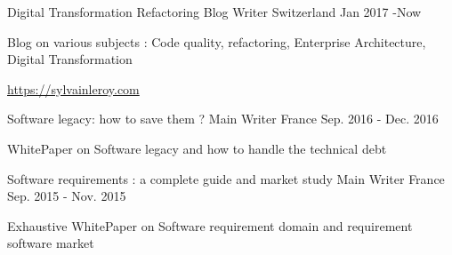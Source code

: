 

\begin{cventries}

\cventry
{Digital Transformation Refactoring} %
{Blog Writer} %
{Switzerland} %
{Jan 2017 -Now} %
{
	\begin{cvitems} %
		\item {Blog on various subjects : Code quality, refactoring, Enterprise Architecture, Digital Transformation}
		\item { \url{https://sylvainleroy.com}}
	\end{cvitems}
}

\cventry
{Software legacy: how to save them ?} %
{Main Writer} %
{France} %
{Sep. 2016 - Dec. 2016} %
{
	\begin{cvitems} %
		\item {WhitePaper on Software legacy and how to handle the technical debt}
	\end{cvitems}
}

  \cventry
    {Software requirements : a complete guide and market study} %
    {Main Writer} %
    {France} %
    {Sep. 2015 - Nov. 2015} %
    {
      \begin{cvitems} %
        \item {Exhaustive WhitePaper on Software requirement domain and requirement software market}
      \end{cvitems}
    }

\end{cventries}
